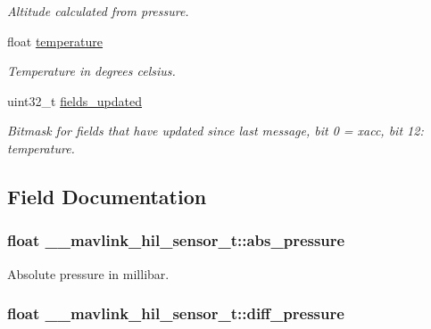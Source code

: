 \begin{DoxyCompactItemize}
\begin{DoxyCompactList}\small\item\em Altitude calculated from pressure. \end{DoxyCompactList}\item 
float \hyperlink{struct____mavlink__hil__sensor__t_a775825e9a485480f835e1b01c9ef878a}{temperature}
\begin{DoxyCompactList}\small\item\em Temperature in degrees celsius. \end{DoxyCompactList}\item 
uint32\+\_\+t \hyperlink{struct____mavlink__hil__sensor__t_a47ccb8d87933c760160e5f6f513f0e90}{fields\+\_\+updated}
\begin{DoxyCompactList}\small\item\em Bitmask for fields that have updated since last message, bit 0 = xacc, bit 12\+: temperature. \end{DoxyCompactList}\end{DoxyCompactItemize}


\subsection{Field Documentation}
\hypertarget{struct____mavlink__hil__sensor__t_a7d05535dddd4be7c92b616ea644cb6cd}{
\subsubsection[{abs\+\_\+pressure}]{\setlength{\rightskip}{0pt plus 5cm}float \+\_\+\+\_\+mavlink\+\_\+hil\+\_\+sensor\+\_\+t\+::abs\+\_\+pressure}}\label{struct____mavlink__hil__sensor__t_a7d05535dddd4be7c92b616ea644cb6cd}


Absolute pressure in millibar. 

\hypertarget{struct____mavlink__hil__sensor__t_a614e2fe0a712bc9619669950f09dd21d}{
\subsubsection[{diff\+\_\+pressure}]{\setlength{\rightskip}{0pt plus 5cm}float \+\_\+\+\_\+mavlink\+\_\+hil\+\_\+sensor\+\_\+t\+::diff\+\_\+pressure}}\label{struct____mavlink__hil__sensor__t_a614e2fe0a712bc9619669950f09dd21d}


